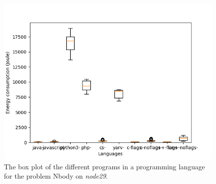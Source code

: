 \begin{appendices}
\begin{table}[h]
\centering
{}
\caption{The comparison of the different languages for the Mandelbrot problem on \textit{node29}. A \textit{+} means that the language on the row has a lower energy consumption then the language on the column, the opposite for \textit{-}, and the \textit{Unknown} means that we could not reject the null hypothesis.}
\label{tab:lang-mandelbrot2}
\end{table}

\begin{figure}[h]
    \centering
    \includegraphics[width=.6\textwidth]{graphs/nbody_BOXoverview2.png}
    \caption{The box plot of the different programs in a programming language for the problem Nbody on \textit{node29}.}
    \label{fig:box-nbody2}
\end{figure}


\end{appendices}
